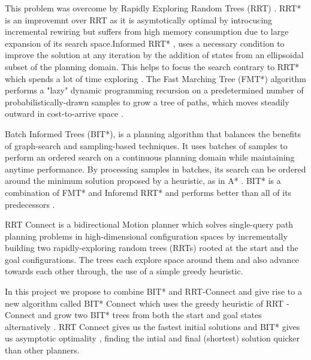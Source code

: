 \documentclass[12pt]{report}
\begin{document}
This problem was overcome by Rapidly Exploring Random Trees (RRT) . RRT* is an improvemnt over RRT as it is asymtotically optimal by introcucing incremental rewiring\cite{6942976} but suffers from high memory consumption due to large expansion of its search space.\cite{noreen2016optimal}Informed RRT* , uses a necessary condition to improve the solution at any iteration by the addition of states from an ellipsoidal subset of the planning domain. \cite{6942976} This helps to focus the search contrary to RRT* which spends a lot of time exploring . The Fast Marching Tree (FMT*) algorithm performs a "lazy" dynamic programming recursion on a predetermined number of probabilistically-drawn samples to grow a tree of paths, which moves steadily outward in cost-to-arrive space \cite{janson2015fast}.

Batch Informed Trees (BIT*), is a planning algorithm that balances the benefits of graph-search and sampling-based techniques. It uses batches of samples to perform an ordered search on a continuous planning domain while maintaining anytime performance. By processing samples in batches, its search can be ordered around the minimum solution proposed by a heuristic, as in A* \cite{7139620}. BIT* is a combination of FMT* and Inforemd RRT* and performs better than all of its predecessors . 

RRT Connect is a bidirectional Motion planner which solves single-query path planning problems in high-dimensional configuration spaces by incrementally building two rapidly-exploring random trees (RRTs) rooted at the start and the goal configurations. The trees each explore space around them and also advance towards each other through, the use of a simple greedy heuristic\cite{844730}.

In this project we propose to combine BIT* and RRT-Connect and give rise to a new algorithm called BIT* Connect which uses the greedy heuristic of RRT - Connect and grow two BIT* trees from both the start and goal states alternatively . RRT Connect gives us the fastest initial solutions and BIT* gives us asymptotic optimality , finding the intial and final (shortest) solution quicker than other planners.
\end{document}

